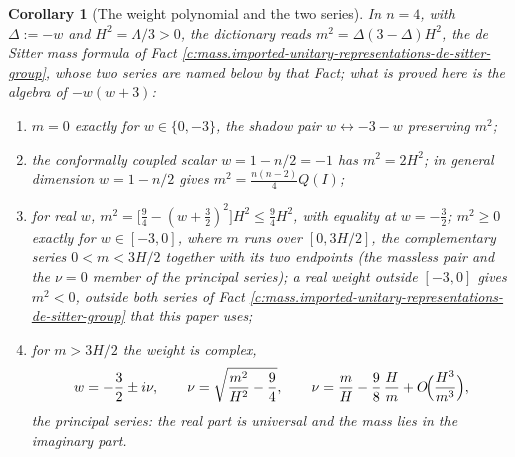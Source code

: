 \documentclass[11pt]{article}
\newtheorem{corollary}[theorem]{Corollary}
\theoremstyle{definition}
\theoremstyle{plain}
\newcommand{\changedmark}[2]{\marginpar{\raggedright\scriptsize\color{#1}#2}}
\begin{document}
\begin{corollary}[The weight polynomial and the two series]\label{c:mass.weight-polynomial-two-series}
\changedmark{gray}{reworded}
In $n = 4$, with $\Delta := -w$ and $H^{2} = \Lambda/3 > 0$, the dictionary reads $m^{2} = \Delta(3-\Delta)H^{2}$, the de Sitter mass formula of Fact \ref{c:mass.imported-unitary-representations-de-sitter-group}, whose two series are named below by that Fact; what is proved here is the algebra of $-w(w+3)$:
\begin{enumerate}
\item $m = 0$ exactly for $w \in \{0, -3\}$, the shadow pair $w \leftrightarrow -3-w$ preserving $m^{2}$;
\item the conformally coupled scalar $w = 1 - n/2 = -1$ has $m^{2} = 2H^{2}$; in general dimension $w = 1 - n/2$ gives $m^{2} = \tfrac{n(n-2)}{4}Q(I)$;
\item for real $w$, $m^{2} = \bigl[\tfrac94 - (w + \tfrac32)^{2}\bigr]H^{2} \le \tfrac94 H^{2}$, with equality at $w = -\tfrac32$; $m^{2} \ge 0$ exactly for $w \in [-3, 0]$, where $m$ runs over $[0, 3H/2]$, the complementary series $0 < m < 3H/2$ together with its two endpoints (the massless pair and the $\nu = 0$ member of the principal series); a real weight outside $[-3,0]$ gives $m^{2} < 0$, outside both series of Fact \ref{c:mass.imported-unitary-representations-de-sitter-group} that this paper uses;
\item for $m > 3H/2$ the weight is complex,
\begin{equation}
w = -\frac32 \pm i\nu, \qquad \nu = \sqrt{\frac{m^{2}}{H^{2}} - \frac94}, \qquad \nu = \frac{m}{H} - \frac98\,\frac{H}{m} + O\!\Bigl(\frac{H^{3}}{m^{3}}\Bigr),
\end{equation}
the principal series: the real part is universal and the mass lies in the imaginary part.
\end{enumerate}
\end{corollary}
\end{document}
